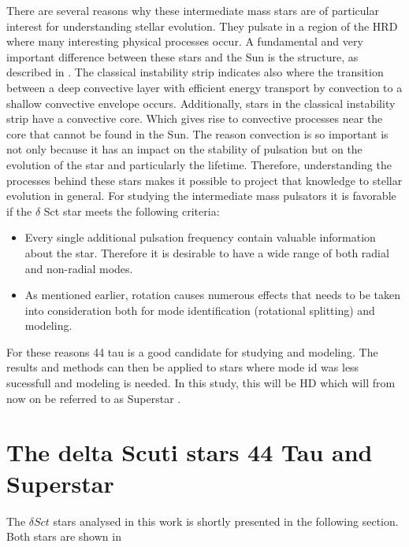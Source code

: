 There are several reasons why these intermediate mass stars are of particular interest for understanding stellar evolution. They pulsate in a region of the HRD where many interesting physical processes occur. A fundamental and very important difference between these stars and the Sun is the structure, as described in . The classical instability strip indicates also where the transition between a deep convective layer with efficient energy transport by convection to a shallow convective envelope occurs. Additionally, stars in the classical instability strip have a convective core. Which gives rise to convective processes near the core that cannot be found in the Sun. The reason convection is so important is not only because it has an impact on the stability of pulsation but on the evolution of the star and particularly the lifetime. Therefore, understanding the processes behind these stars makes it possible to project that knowledge to stellar evolution in general. 
For studying the intermediate mass pulsators it is favorable if the $\delta$ Sct star meets the following criteria: 

\begin{itemize}
    \item Every single additional pulsation frequency contain valuable information about the star. Therefore it is desirable to have a wide range of both radial and non-radial modes. 
    \item As mentioned earlier, rotation causes numerous effects that needs to be taken into consideration both for mode identification (rotational splitting) and modeling. 
\end{itemize}

For these reasons 44 tau is a good candidate for studying and modeling. The results and methods can then be applied to stars where mode id was less sucessfull and modeling is needed. In this study, this will be HD which will from now on be referred to as Superstar \citet{antoci2014role}. 

\section{The delta Scuti stars 44 Tau and Superstar}

The $\delta Sct$ stars analysed in this work is shortly presented in the following section. Both stars are shown in %
\\
 

